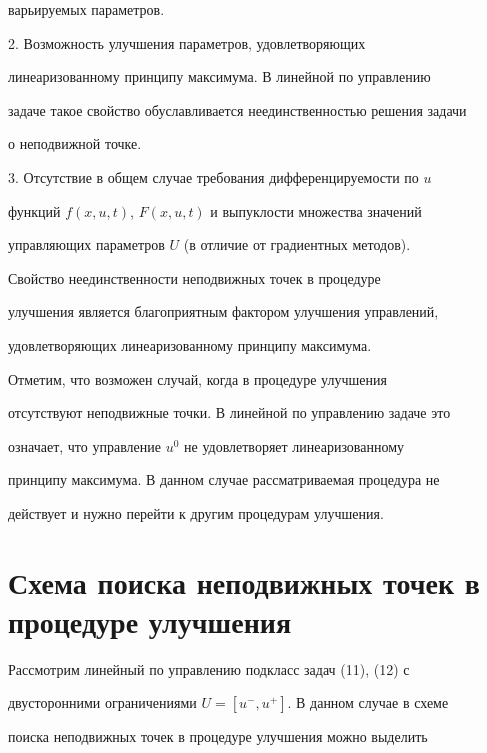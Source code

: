 варьируемых параметров. 


 


2. Возможность улучшения параметров, удовлетворяющих 


линеаризованному принципу максимума. В линейной по управлению 


задаче такое свойство обуславливается неединственностью решения задачи 


о неподвижной точке. 


 


3. Отсутствие в общем случае требования дифференцируемости по $u$ 


функций $f(x,u,t)$, $F(x,u,t)$ и выпуклости множества значений 


управляющих параметров $U$ (в отличие от градиентных методов). 


 


Свойство неединственности неподвижных точек в процедуре 


улучшения является благоприятным фактором улучшения управлений, 


удовлетворяющих линеаризованному принципу максимума. 


 


Отметим, что возможен случай, когда в процедуре улучшения 


отсутствуют неподвижные точки. В линейной по управлению задаче это 


означает, что управление $u^0$ не удовлетворяет линеаризованному 


принципу максимума. В данном случае рассматриваемая процедура не 


действует и нужно перейти к другим процедурам улучшения. 


 


\section{Схема поиска неподвижных точек в процедуре улучшения} 


 


Рассмотрим линейный по управлению подкласс задач (11), (12) с 


двусторонними ограничениями $U=[u^-,u^+]$. В данном случае в схеме 


поиска неподвижных точек в процедуре улучшения можно выделить 


